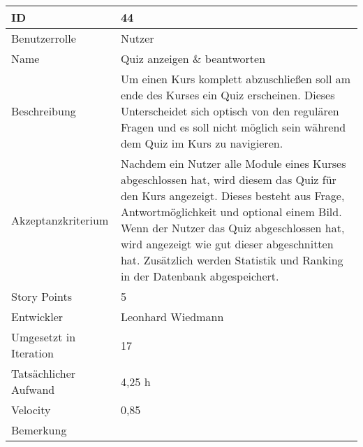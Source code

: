 \begin{tabularx}{\textwidth}{|p{}|X|}
	\hline
	ID & 44\\
	\hline
	Benutzerrolle & Nutzer\\
	\hline
	Name & Quiz anzeigen \& beantworten\\
	\hline
	Beschreibung & Um einen Kurs komplett abzuschließen soll am ende des Kurses ein Quiz erscheinen. Dieses Unterscheidet sich optisch von den regulären Fragen und es soll nicht möglich sein während dem Quiz im Kurs zu navigieren.\\
	\hline
	Akzeptanzkriterium & Nachdem ein Nutzer alle Module eines Kurses abgeschlossen hat, wird diesem das Quiz für den Kurs angezeigt. Dieses besteht aus Frage, Antwortmöglichkeit und optional einem Bild. Wenn der Nutzer das Quiz abgeschlossen hat, wird angezeigt wie gut dieser abgeschnitten hat. Zusätzlich werden Statistik und Ranking in der Datenbank abgespeichert. \\
	\hline
	Story Points & 5\\
	\hline
	Entwickler & Leonhard Wiedmann\\
	\hline
	Umgesetzt in Iteration & 17\\
	\hline
	Tatsächlicher Aufwand & 4,25 h\\
	\hline
	Velocity & 0,85\\
	\hline
	Bemerkung & \\
	\hline
\end{tabularx}
\vspace{20pt}
